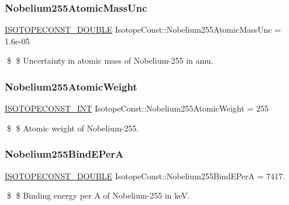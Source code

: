 \subsubsection{\texorpdfstring{Nobelium255\+Atomic\+Mass\+Unc}{Nobelium255AtomicMassUnc}}
{\footnotesize\ttfamily \mbox{\hyperlink{group___isotope_const-_macros_ga8f45a7272ce02c0b4c65c44636ed719a}{I\+S\+O\+T\+O\+P\+E\+C\+O\+N\+S\+T\+\_\+\+D\+O\+U\+B\+LE}} Isotope\+Const\+::\+Nobelium255\+Atomic\+Mass\+Unc = 1.\+6e-\/05}

\$ \$ Uncertainty in atomic mass of Nobelium-\/255 in amu. \mbox{\label{group___isotope_const-_nobelium-_no255_ga00d729594fc87b269e3731daa9a0a108}} 
\subsubsection{\texorpdfstring{Nobelium255\+Atomic\+Weight}{Nobelium255AtomicWeight}}
{\footnotesize\ttfamily \mbox{\hyperlink{group___isotope_const-_macros_ga5f18360b3e99483a35c32d789e62621c}{I\+S\+O\+T\+O\+P\+E\+C\+O\+N\+S\+T\+\_\+\+I\+NT}} Isotope\+Const\+::\+Nobelium255\+Atomic\+Weight = 255}

\$ \$ Atomic weight of Nobelium-\/255. \mbox{\label{group___isotope_const-_nobelium-_no255_ga0083fccfe192943f4fb19c70deb1c777}} 
\subsubsection{\texorpdfstring{Nobelium255\+Bind\+E\+PerA}{Nobelium255BindEPerA}}
{\footnotesize\ttfamily \mbox{\hyperlink{group___isotope_const-_macros_ga8f45a7272ce02c0b4c65c44636ed719a}{I\+S\+O\+T\+O\+P\+E\+C\+O\+N\+S\+T\+\_\+\+D\+O\+U\+B\+LE}} Isotope\+Const\+::\+Nobelium255\+Bind\+E\+PerA = 7417.}

\$ \$ Binding energy per A of Nobelium-\/255 in keV. \mbox{\label{group___isotope_const-_nobelium-_no255_gaaaa0b0059ac018c09a8df104e069330e}} 
